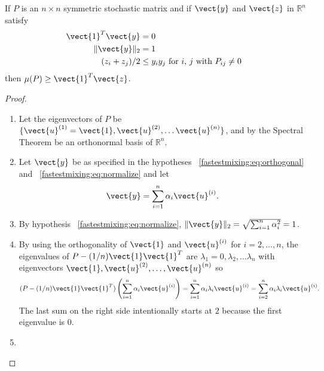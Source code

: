 \documentclass[12pt]{article}
\begin{document}
\begin{lemma}
    \label{fastestmixing:lemma:two} If \( P \) is an \( n \times n \)
    symmetric stochastic matrix and if \( \vect{y} \) and \( \vect{z} \)
    in \( \mathbb{R}^n \) satisfy
    \begin{align}
        \vect{1}^T \vect{y} &= 0%
        \label{fastestmixing:eq:orthogonal}\\
        \| \vect{y} \|_2 &= 1%
        \label{fastestmixing:eq:normalize} \\
        (z_i + z_j)/2 &\le y_i y_j \text{ for \( i \), \( j \) with \( P_
        {ij} \ne 0 \) }%
        \label{fastestmixing:eq:inequality}
    \end{align}
    then \( \mu(P) \ge \vect{1}^T \vect{z} \).
\end{lemma}

\begin{proof}
    \begin{enumerate}
        \item
            Let the eigenvectors of \( P \) be \( \{ \vect{u}^{(1)} =
            \vect{1}, \vect{u}^{(2)}, \dots \vect{u}^{(n)} \} \), and by
            the Spectral Theorem be an orthonormal basis of \( \mathbb{R}^n
            \).
        \item
            Let \( \vect{y} \) be as specified in the hypotheses~%
            \eqref{fastestmixing:eq:orthogonal} and~%
            \eqref{fastestmixing:eq:normalize} and let
            \[
                \vect{y} = \sum_{i=1}^{n} \alpha_i \vect{u}^{(i)}.
            \]
        \item
            By hypothesis~%
            \eqref{fastestmixing:eq:normalize}, \( \| \vect{y} \|_2 =
            \sqrt{\sum_{i=1}^n \alpha_i^2 } = 1 \).
        \item
            By using the orthogonality of \( \vect{1} \) and \( \vect {u}^
            {(i)} \) for \( i = 2, \dots, n \), the eigenvalues of \( P
            - (1/n)\vect{1}\vect{1}^T \) are \( \lambda_1 = 0, \lambda_2,
            \dots \lambda_n \) with eigenvectors \( \vect{1}, \vect{u}^{%
            (2)}, \dots, \vect{u}^{(n)} \) so
            \[
                (P - (1/n)\vect{1}\vect{1}^T) \left( \sum_{i=1}^n \alpha_i
                \vect {u}^ {(i)} \right) = \sum_{i=1}^n \alpha_i \lambda_i
                \vect{u}^{(i)} = \sum_{i=2}^n \alpha_i \lambda_i \vect{u}^
                {(i)}.
            \] The last sum on the right side intentionally starts at \(
            2 \) because the first eigenvalue is \( 0 \).
        \item

\end{enumerate}
\end{proof}
\end{document}
